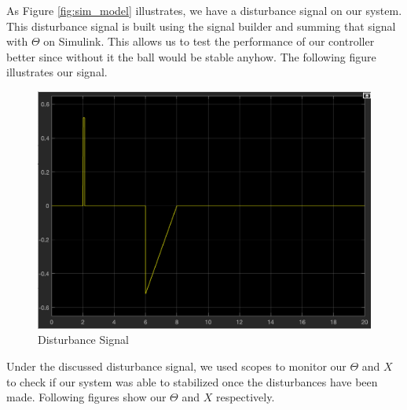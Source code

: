 As Figure \ref{fig:sim_model} illustrates, we have a disturbance signal on our system. This disturbance signal is built using the signal builder and summing that signal with $\Theta$ on Simulink. This allows us to test the performance of our controller better since without it the ball would be stable anyhow. The following figure illustrates our signal. 

\begin{figure}[H]
    \centering
    \includegraphics[width=.6\textwidth]{images/dist.png}
    \caption{Disturbance Signal}
    \label{fig:dist}
\end{figure}

Under the discussed disturbance signal, we used scopes to monitor our $\Theta$ and $X$ to check if our system was able to stabilized once the disturbances have been made. Following figures show our $\Theta$ and $X$ respectively.

